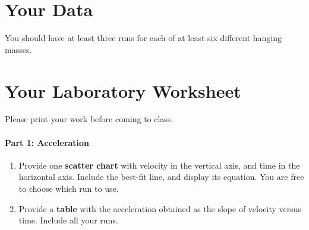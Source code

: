 \section{Your Data}
%
You should have at least three runs for each of at least six different hanging masses.
%
%
\newpage
\section{Your Laboratory Worksheet}
%
Please print your work before coming to class.
%
\paragraph{Part 1: Acceleration}
%
\begin{enumerate}
    \item Provide one \textbf{scatter chart} with velocity in the vertical axis, and time in the horizontal axis. Include the best-fit line, and display its equation. You are free to choose which run to use.
    \item Provide a \textbf{table} with the acceleration obtained as the slope of velocity versus time. Include all your runs.
\end{enumerate}
%
